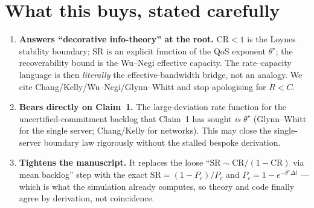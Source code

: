 \documentclass[11pt]{article}
\newcommand{\CR}{\mathrm{CR}}
\newcommand{\SR}{\mathrm{SR}}
\begin{document}
\section{What this buys, stated carefully}
\begin{enumerate}
\item \textbf{Answers ``decorative info-theory'' at the root.} $\CR<1$ is the Loynes stability boundary;
$\SR$ is an explicit function of the QoS exponent $\theta^\star$; the recoverability bound is the Wu--Negi
effective capacity. The rate--capacity language is then \emph{literally} the effective-bandwidth bridge,
not an analogy. We cite Chang/Kelly/Wu--Negi/Glynn--Whitt and stop apologising for $R<C$.
\item \textbf{Bears directly on Claim~1.} The large-deviation rate function for the uncertified-commitment
backlog that Claim~1 has sought \emph{is} $\theta^\star$ (Glynn--Whitt for the single server; Chang/Kelly for
networks). This may close the single-server boundary law rigorously without the stalled bespoke derivation.
\item \textbf{Tightens the manuscript.} It replaces the loose ``$\SR\sim\CR/(1-\CR)$ via mean backlog'' step
with the exact $\SR=(1-P_c)/P_c$ and $P_c=1-e^{-\theta^\star\Delta t}$ --- which is what the simulation
already computes, so theory and code finally agree by derivation, not coincidence.
\end{enumerate}
\end{document}
